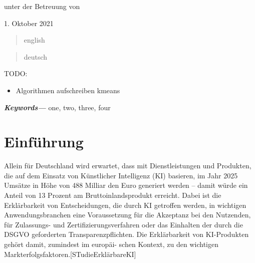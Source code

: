 \documentclass[11pt,a4paper]{article}
\providecommand{\keywords}[1]
{
	\small	
	\textbf{\textit{Keywords---}} #1
}
\numberwithin{equation}{section}
\begin{document}
\begin{titlepage}
		
		
		
		
		\vspace{1cm}
		unter der Betreuung von\par
		\centering
		\begin{figure}[h]
			
		\end{figure}
		{\large 1. Oktober 2021}
	\end{titlepage}
	
	
	
	\begin{abstract}english\end{abstract}
	\begin{abstract}deutsch\end{abstract}
	TODO:
	\begin{itemize}
		\item Algorithmen aufschreiben kmeans
		
	\end{itemize}
	\keywords{one, two, three, four}
	\newpage
	\listoffigures
	
	\listoftables
	
	\lstlistoflistings
	
	\listofalgorithms
	\newpage
	\tableofcontents
	\newpage
	\section{Einführung}
	Allein für Deutschland wird erwartet, dass mit Dienstleistungen und Produkten, die auf dem
	Einsatz von Künstlicher Intelligenz (KI) basieren, im Jahr 2025 Umsätze in Höhe von 488 Milliar­
	den Euro generiert werden – damit würde ein Anteil von 13 Prozent am Bruttoinlandsprodukt
	erreicht. Dabei ist die Erklärbarkeit von Entscheidungen, die durch KI getroffen werden, in
	wichtigen Anwendungsbranchen eine Voraussetzung für die Akzeptanz bei den Nutzenden, für
	Zulassungs- und Zertifizierungsverfahren oder das Einhalten der durch die DSGVO geforderten
	Transparenzpflichten. Die Erklärbarkeit von KI-Produkten gehört damit, zumindest im europäi-
	schen Kontext, zu den wichtigen Markterfolgsfaktoren.[STudieErklärbareKI]
	
\end{document}
